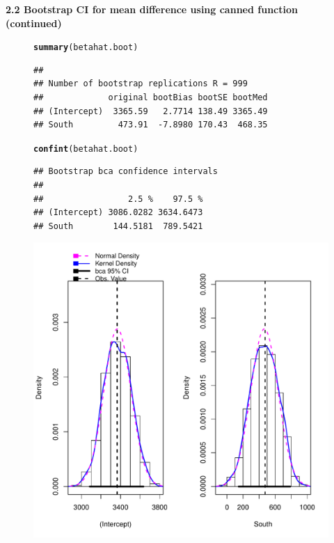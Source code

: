 \documentclass[10pt,handout]{beamer}\usepackage[]{graphicx}\usepackage[]{color}
\makeatletter
\def\maxwidth{ %
  \ifdim\Gin@nat@width>\linewidth
    \linewidth
  \else
    \Gin@nat@width
  \fi
}
\newcommand{\hlstd}[1]{\textcolor[rgb]{0.345,0.345,0.345}{#1}}%
\newcommand{\hlkwd}[1]{\textcolor[rgb]{0.737,0.353,0.396}{\textbf{#1}}}%
\newenvironment{kframe}{%
 \def\at@end@of@kframe{}%
 \ifinner\ifhmode%
  \def\at@end@of@kframe{\end{minipage}}%
  \begin{minipage}{\columnwidth}%
 \fi\fi%
 \def\FrameCommand##1{\hskip\@totalleftmargin \hskip-\fboxsep
 \colorbox{shadecolor}{##1}\hskip-\fboxsep
     \hskip-\linewidth \hskip-\@totalleftmargin \hskip\columnwidth}%
 \MakeFramed {\advance\hsize-\width
   \@totalleftmargin\z@ \linewidth\hsize
   \@setminipage}}%
 {\par\unskip\endMakeFramed%
 \at@end@of@kframe}
\newenvironment{knitrout}{}{} %
\makeatother
\begin{document}
\begin{frame}[fragile,plain]
	\small
	\textbf{2.2 Bootstrap CI for mean difference using canned function (continued)}

		\begin{figure}
		\begin{minipage}[h]{0.45\linewidth}
\begin{knitrout}\tiny
{}\color{fgcolor}\begin{kframe}
\begin{alltt}
\hlkwd{summary}\hlstd{(betahat.boot)}
\end{alltt}
\begin{verbatim}
## 
## Number of bootstrap replications R = 999 
##             original bootBias bootSE bootMed
## (Intercept)  3365.59   2.7714 138.49 3365.49
## South         473.91  -7.8980 170.43  468.35
\end{verbatim}
\begin{alltt}
\hlkwd{confint}\hlstd{(betahat.boot)}
\end{alltt}
\begin{verbatim}
## Bootstrap bca confidence intervals
## 
##                 2.5 %    97.5 %
## (Intercept) 3086.0282 3634.6473
## South        144.5181  789.5421
\end{verbatim}
\end{kframe}
\end{knitrout}
			
		\end{minipage}
		\hspace{0.4cm}
		\begin{minipage}[h]{0.50\linewidth}
\begin{knitrout}\tiny
{}\color{fgcolor}

{\centering \includegraphics[width=\maxwidth]{figure/unnamed-chunk-11-1} 

}
\end{knitrout}
\end{minipage}
\end{figure}
\end{frame}
\end{document}

